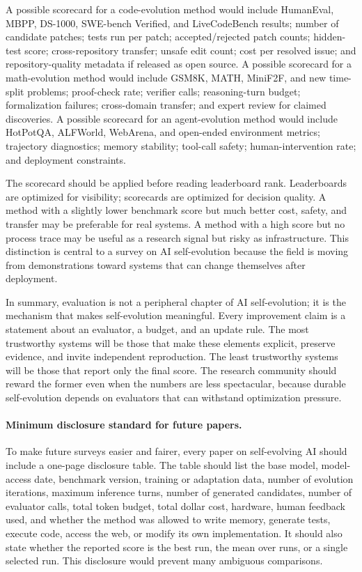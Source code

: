 A possible scorecard for a code-evolution method would include HumanEval, MBPP, DS-1000, SWE-bench Verified, and LiveCodeBench results; number of candidate patches; tests run per patch; accepted/rejected patch counts; hidden-test score; cross-repository transfer; unsafe edit count; cost per resolved issue; and repository-quality metadata if released as open source. A possible scorecard for a math-evolution method would include GSM8K, MATH, MiniF2F, and new time-split problems; proof-check rate; verifier calls; reasoning-turn budget; formalization failures; cross-domain transfer; and expert review for claimed discoveries. A possible scorecard for an agent-evolution method would include HotPotQA, ALFWorld, WebArena, and open-ended environment metrics; trajectory diagnostics; memory stability; tool-call safety; human-intervention rate; and deployment constraints.

The scorecard should be applied before reading leaderboard rank. Leaderboards are optimized for visibility; scorecards are optimized for decision quality. A method with a slightly lower benchmark score but much better cost, safety, and transfer may be preferable for real systems. A method with a high score but no process trace may be useful as a research signal but risky as infrastructure. This distinction is central to a survey on AI self-evolution because the field is moving from demonstrations toward systems that can change themselves after deployment.

In summary, evaluation is not a peripheral chapter of AI self-evolution; it is the mechanism that makes self-evolution meaningful. Every improvement claim is a statement about an evaluator, a budget, and an update rule. The most trustworthy systems will be those that make these elements explicit, preserve evidence, and invite independent reproduction. The least trustworthy systems will be those that report only the final score. The research community should reward the former even when the numbers are less spectacular, because durable self-evolution depends on evaluators that can withstand optimization pressure.

\paragraph{Minimum disclosure standard for future papers.}
To make future surveys easier and fairer, every paper on self-evolving AI should include a one-page disclosure table. The table should list the base model, model-access date, benchmark version, training or adaptation data, number of evolution iterations, maximum inference turns, number of generated candidates, number of evaluator calls, total token budget, total dollar cost, hardware, human feedback used, and whether the method was allowed to write memory, generate tests, execute code, access the web, or modify its own implementation. It should also state whether the reported score is the best run, the mean over runs, or a single selected run. This disclosure would prevent many ambiguous comparisons.

